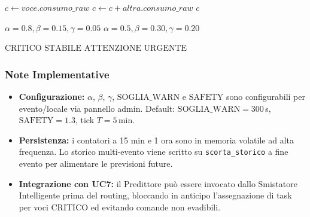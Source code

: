 \begin{algorithm}[H]
\caption{Funzioni ausiliarie}
\label{alg:funzioni_ausiliarie}
\begin{algorithmic}[1]
 
    \State $c \gets voce.consumo\_raw$
                \State $c \gets c + altra.consumo\_raw$
            \EndIf
        \EndFor
    \EndFor
    \State \Return $c$
\EndProcedure

\medskip

 
        \State \Return $\alpha=0.8, \beta=0.15, \gamma=0.05$ 
    \Else
        \State \Return $\alpha=0.5, \beta=0.30, \gamma=0.20$ 
    \EndIf
\EndProcedure

\medskip

 
     \Return $\text{CRITICO}$ \EndIf
     \Return $\text{STABILE}$ \EndIf
     \Return $\text{ATTENZIONE}$ \EndIf
    \State \Return $\text{URGENTE}$
\EndProcedure
\end{algorithmic}
\end{algorithm}

\subsubsection*{Note Implementative}
\begin{itemize}
    \item \textbf{Configurazione:} $\alpha$, $\beta$, $\gamma$, $\text{SOGLIA\_WARN}$ e $\text{SAFETY}$ sono configurabili per evento/locale via pannello admin. Default: $\text{SOGLIA\_WARN} = 300$\,s, $\text{SAFETY} = 1.3$, tick $T = 5$\,min.
    \item \textbf{Persistenza:} i contatori a 15 min e 1 ora sono in memoria volatile ad alta frequenza. Lo storico multi-evento viene scritto su \texttt{scorta\_storico} a fine evento per alimentare le previsioni future.
    \item \textbf{Integrazione con UC7:} il Predittore può essere invocato dallo Smistatore Intelligente prima del routing, bloccando in anticipo l'assegnazione di task per voci CRITICO ed evitando comande non evadibili.
\end{itemize}

